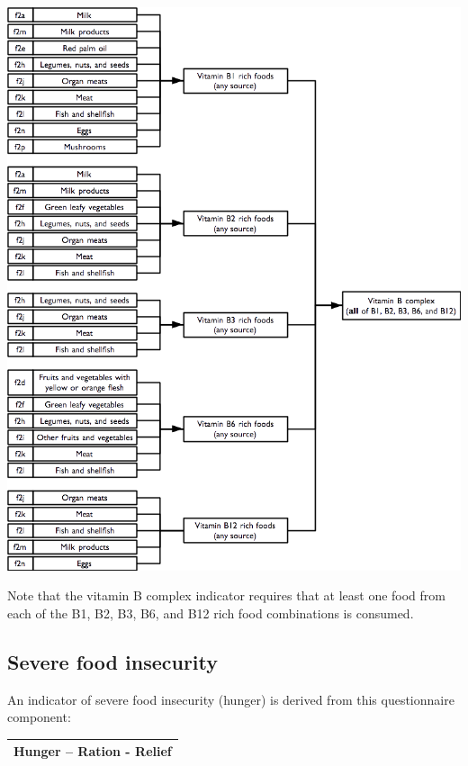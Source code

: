 \documentclass[12pt,a4paper]{book}
\theoremstyle{definition}
\theoremstyle{definition}
\theoremstyle{definition}
\theoremstyle{remark}
\begin{document}
\begin{center}\includegraphics{figures/indicators14} \end{center}

Note that the vitamin B complex indicator requires that at least one
food from each of the B1, B2, B3, B6, and B12 rich food combinations is
consumed.

\hypertarget{severe-food-insecurity}{%
\subsection{Severe food insecurity}\label{severe-food-insecurity}}

An indicator of severe food insecurity (hunger) is derived from this
questionnaire component:

\begin{longtable}[]{@{}c@{}}
\toprule
\begin{minipage}[t]{0.97\columnwidth}\centering
\textbf{Hunger -- Ration - Relief}\strut
\end{minipage}\tabularnewline
\bottomrule
\end{longtable}
\end{document}
